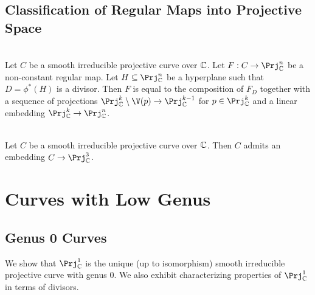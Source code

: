 \documentclass[a4paper]{article}
\begin{document}
\subsection{Classification of Regular Maps into Projective Space}
\begin{thm}{}{}\\
Let $C$ be a smooth irreducible projective curve over $\mathbb{C}$. Let $F:C\to\Prj_\C^n$ be a non-constant regular map. Let $H\subseteq\Prj_\C^n$ be a hyperplane such that $D=\phi^\ast(H)$ is a divisor. Then $F$ is equal to the composition of $F_D$ together with a sequence of projections $\Prj_\C^k\setminus\V(p)\to\Prj_\C^{k-1}$ for $p\in\Prj_\C^k$ and a linear embedding $\Prj_\C^k\to\Prj_\C^n$. 
\end{thm}

\begin{thm}{}{}\\
Let $C$ be a smooth irreducible projective curve over $\mathbb{C}$. Then $C$ admits an embedding $C\to\Prj_\C^3$. 
\end{thm}

\pagebreak
\section{Curves with Low Genus}
\subsection{Genus 0 Curves}
We show that $\Prj_\C^1$ is the unique (up to isomorphism) smooth irreducible projective curve with genus $0$. We also exhibit characterizing properties of $\Prj_\C^1$ in terms of divisors. 
\end{document}
